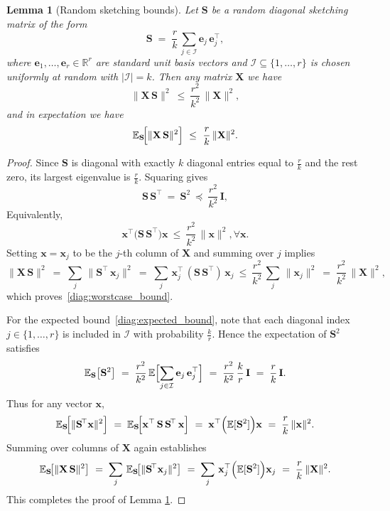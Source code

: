 \documentclass{article} %
\theoremstyle{plain}
\newtheorem{lemma}[theorem]{Lemma}
\theoremstyle{definition}
\begin{document}
\begin{lemma}[Random sketching bounds]\label{lamma:sketching_bound}
Let $\mathbf{S}$ be a random diagonal sketching matrix of the form
\[
\mathbf{S}
\;=\;
\frac{r}{k}\,\sum_{j \in \mathcal{I}} \mathbf{e}_j\,\mathbf{e}_j^{\top},
\]
where \(\mathbf{e}_1, \dots, \mathbf{e}_r \in \mathbb{R}^r\) are standard unit basis vectors and $\mathcal{I}\subseteq \{1,\dots,r\}$ is chosen uniformly at random with $|\mathcal{I}|=k$. Then any matrix $\mathbf{X}$ we have
\begin{equation}\label{diag:worstcase_bound}
\|\mathbf{X}\,\mathbf{S}\|^{2}
~\le~
\frac{r^{2}}{k^{2}}
\,\|\mathbf{X}\|^{2},
\end{equation}
and in expectation we have
\begin{equation}\label{diag:expected_bound}
\mathbb{E}_{\mathbf{S}}\!\Bigl[\|\mathbf{X}\,\mathbf{S}\|^{2}\Bigr]
~\le~
\frac{r}{k}
\,\|\mathbf{X}\|^{2}.
\end{equation}
\end{lemma}

\begin{proof}
Since $\mathbf{S}$ is diagonal with exactly $k$ diagonal entries equal to $\tfrac{r}{k}$ and the rest zero, its largest eigenvalue is $\tfrac{r}{k}$.  Squaring gives
\[
\mathbf{S}\,\mathbf{S}^{\!\top}
~=~
\mathbf{S}^{2}
~\preceq~
\frac{r^{2}}{k^{2}}
\,\mathbf{I},
\]
Equivalently,
\[
\mathbf{x}^{\top}
\bigl(\mathbf{S}\,\mathbf{S}^{\!\top}\bigr)
\mathbf{x}
~\le~
\frac{r^{2}}{k^{2}}
\,\|\mathbf{x}\|^{2},
 \forall \mathbf{x}.
\]
Setting $\mathbf{x} = \mathbf{x}_j$ to be the $j$-th column of $\mathbf{X}$ and summing over $j$ implies
\[
\|\mathbf{X}\,\mathbf{S}\|^{2}
~
=\;
\sum_{j}
\,\|\mathbf{S}^{\!\top}\,\mathbf{x}_j\|^{2}
~
=\;
\sum_{j}
\,\mathbf{x}_j^{\top}
\,(\mathbf{S}\,\mathbf{S}^{\!\top})
\,\mathbf{x}_j
~\le~
\frac{r^{2}}{k^{2}}
\,\sum_{j}
\,\|\mathbf{x}_j\|^{2}
~
=\;
\frac{r^{2}}{k^{2}}
\,\|\mathbf{X}\|^{2},
\]
which proves~\eqref{diag:worstcase_bound}.

For the expected bound~\eqref{diag:expected_bound}, note that each diagonal index $j\in\{1,\dots,r\}$ is included in $\mathcal{I}$ with probability $\tfrac{k}{r}$.  Hence the expectation of $\mathbf{S}^{2}$ satisfies
\[
\mathbb{E}_{\mathbf{S}}\bigl[\mathbf{S}^{2}\bigr]
~
=\;
\frac{r^{2}}{k^{2}}
\,\mathbb{E}\Bigl[\sum_{j\in \mathcal{I}} \mathbf{e}_j\,\mathbf{e}_j^{\top}\Bigr]
~
=\;
\frac{r^{2}}{k^{2}}
\,
\frac{k}{r}\,\mathbf{I}
~
=\;
\frac{r}{k}\,\mathbf{I}.
\]
Thus for any vector $\mathbf{x}$,
\[
\mathbb{E}_{\mathbf{S}}
\!\Bigl[\|\mathbf{S}^{\!\top}\mathbf{x}\|^{2}\Bigr]
~
=\;
\mathbb{E}_{\mathbf{S}}
\!\Bigl[\mathbf{x}^{\top}\,\mathbf{S}\,\mathbf{S}^{\!\top}\,\mathbf{x}\Bigr]
~
=\;
\mathbf{x}^{\top}
\Bigl(\mathbb{E}[\mathbf{S}^{2}]\Bigr)
\mathbf{x}
~
=\;
\frac{r}{k}\,\|\mathbf{x}\|^{2}.
\]
Summing over columns of $\mathbf{X}$ again establishes
\[
\mathbb{E}_{\mathbf{S}}
\!\bigl[\|\mathbf{X}\,\mathbf{S}\|^{2}\bigr]
~
=\;
\sum_{j}
\,\mathbb{E}_{\mathbf{S}}
\!\bigl[\|\mathbf{S}^{\!\top}\mathbf{x}_j\|^{2}\bigr]
~
=\;
\sum_{j}
\,\mathbf{x}_j^{\top}
\Bigl(\mathbb{E}[\mathbf{S}^{2}]\Bigr)
\mathbf{x}_j
~
=\;
\frac{r}{k}
\,\|\mathbf{X}\|^{2}.
\]
This completes the proof of Lemma \ref{lamma:sketching_bound}.
\end{proof}
\end{document}
